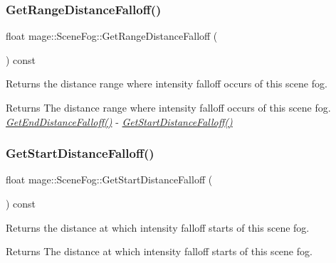 \subsubsection{\texorpdfstring{Get\+Range\+Distance\+Falloff()}{GetRangeDistanceFalloff()}}
{\footnotesize\ttfamily float mage\+::\+Scene\+Fog\+::\+Get\+Range\+Distance\+Falloff (\begin{DoxyParamCaption}{ }\end{DoxyParamCaption}) const\hspace{0.3cm}{\ttfamily [noexcept]}}

Returns the distance range where intensity falloff occurs of this scene fog.

\begin{DoxyReturn}{Returns}
The distance range where intensity falloff occurs of this scene fog. {\itshape \hyperlink{structmage_1_1_scene_fog_a9f2d7ed1c03054ca305b500059c8c1f1}{Get\+End\+Distance\+Falloff()}} -\/ {\itshape \hyperlink{structmage_1_1_scene_fog_ad3b72493806860f0e829f1ff738f1895}{Get\+Start\+Distance\+Falloff()}} 
\end{DoxyReturn}
\hypertarget{structmage_1_1_scene_fog_ad3b72493806860f0e829f1ff738f1895}{}\label{structmage_1_1_scene_fog_ad3b72493806860f0e829f1ff738f1895} 
\subsubsection{\texorpdfstring{Get\+Start\+Distance\+Falloff()}{GetStartDistanceFalloff()}}
{\footnotesize\ttfamily float mage\+::\+Scene\+Fog\+::\+Get\+Start\+Distance\+Falloff (\begin{DoxyParamCaption}{ }\end{DoxyParamCaption}) const\hspace{0.3cm}{\ttfamily [noexcept]}}

Returns the distance at which intensity falloff starts of this scene fog.

\begin{DoxyReturn}{Returns}
The distance at which intensity falloff starts of this scene fog. 
\end{DoxyReturn}
\hypertarget{structmage_1_1_scene_fog_a2312784458fe9d8e88dcfe5c444866a4}{}\label{structmage_1_1_scene_fog_a2312784458fe9d8e88dcfe5c444866a4} 
